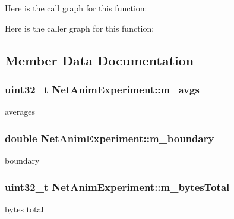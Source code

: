 Here is the call graph for this function\+:




Here is the caller graph for this function\+:




\subsection{Member Data Documentation}
\subsubsection[{\texorpdfstring{m\+\_\+avgs}{m_avgs}}]{\setlength{\rightskip}{0pt plus 5cm}uint32\+\_\+t Net\+Anim\+Experiment\+::m\+\_\+avgs}\hypertarget{classNetAnimExperiment_aa5c4b8cecba30d0e970bd1ea1625af05}{}\label{classNetAnimExperiment_aa5c4b8cecba30d0e970bd1ea1625af05}


averages 

\subsubsection[{\texorpdfstring{m\+\_\+boundary}{m_boundary}}]{\setlength{\rightskip}{0pt plus 5cm}double Net\+Anim\+Experiment\+::m\+\_\+boundary}\hypertarget{classNetAnimExperiment_a172cb08bfa569ac31ad597a6770a467d}{}\label{classNetAnimExperiment_a172cb08bfa569ac31ad597a6770a467d}


boundary 

\subsubsection[{\texorpdfstring{m\+\_\+bytes\+Total}{m_bytesTotal}}]{\setlength{\rightskip}{0pt plus 5cm}uint32\+\_\+t Net\+Anim\+Experiment\+::m\+\_\+bytes\+Total}\hypertarget{classNetAnimExperiment_ac826fc02c4742d11f53af43c6bca0feb}{}\label{classNetAnimExperiment_ac826fc02c4742d11f53af43c6bca0feb}


bytes total 

